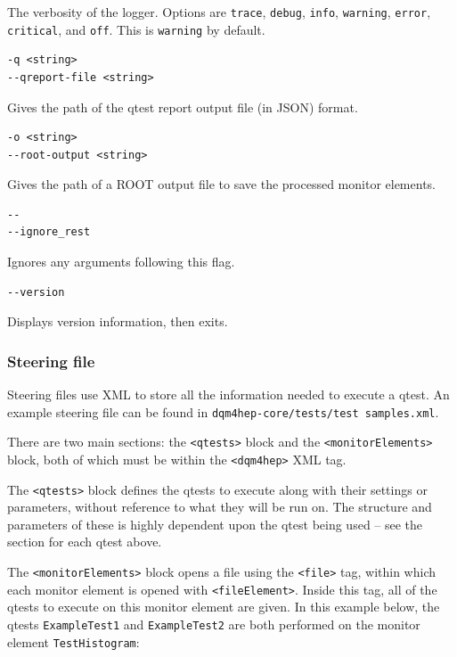 The verbosity of the logger. Options are \texttt{trace}, \texttt{debug}, \texttt{info}, \texttt{warning}, \texttt{error}, \texttt{critical}, and \texttt{off}. This is \texttt{warning} by default.

\begin{lstlisting}
-q <string>
--qreport-file <string>
\end{lstlisting}

Gives the path of the \acrshort{qtest} report output file (in \acrshort{JSON}) format.

\begin{lstlisting}
-o <string>
--root-output <string>
\end{lstlisting}

Gives the path of a ROOT output file to save the processed monitor elements.

\begin{lstlisting}
--
--ignore_rest
\end{lstlisting}

Ignores any arguments following this flag.

\begin{lstlisting}
--version
\end{lstlisting}

Displays version information, then exits.

\subsubsection{Steering file}
Steering files use \acrshort{XML} to store all the information needed to execute a \acrshort{qtest}. An example steering file can be found in \texttt{dqm4hep-core/tests/test \textunderscore samples.xml}.

There are two main sections: the \texttt{<qtests>} block and the \texttt{<monitorElements>} block, both of which must be within the \texttt{<dqm4hep>} XML tag.

The \texttt{<qtests>} block defines the \acrshort{qtest}s to execute along with their settings or parameters, without reference to what they will be run on. The structure and parameters of these is highly dependent upon the \acrshort{qtest} being used – see the section for each \acrshort{qtest} above.

The \texttt{<monitorElements>} block opens a file using the \texttt{<file>} tag, within which each monitor element is opened with \texttt{<fileElement>}. Inside this tag, all of the \acrshort{qtest}s to execute on this monitor element are given. In this example below, the \acrshort{qtest}s \texttt{ExampleTest1} and \texttt{ExampleTest2} are both performed on the monitor element \texttt{TestHistogram}:

